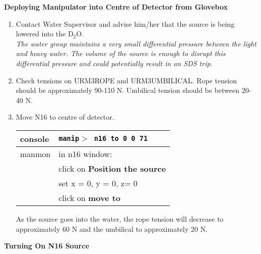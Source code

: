 \begin{center}
              {\bf Deploying Manipulator into Centre of 
            Detector from Glovebox}
\end{center}
 

\begin{enumerate}



 \item \checkbox Contact Water Supervisor and advise him/her that the source is
   being lowered into the D$_2$O.  \\
   \small
   {\em
     The water group maintains a very small differential pressure
     between the light and heavy water.  The volume of the source
     is enough to disrupt this differential pressure and could potentially
     result in an SDS trip.
   }
   \normalsize

 \item \checkbox Check tensions on URM3ROPE and URM3UMBILICAL.  Rope tension
   should be approximately 90-110 N.  Umbilical tension should
   be between 20-40 N.
  
 \item \checkbox Move N16 to centre of detector.
  \begin{center}
  \begin{tabular}{|l|l|}
  \hline
  console & {\tt manip$>$ n16 to 0 0 71} \\
  \hline
  manmon  & in n16 window: \\
          & click on {\bf Position the source}\\
          & set x = 0, y = 0, z= 0\\
          & click on {\bf move to} \\
  \hline
  \end{tabular}
  \end{center}
  As the source goes into the water, the rope tension will decrease to
  approximately 60 N and the umbilical to approximately 20 N.

\end{enumerate}
\begin{center}
                {\bf Turning On N16 Source}
\end{center}
  

